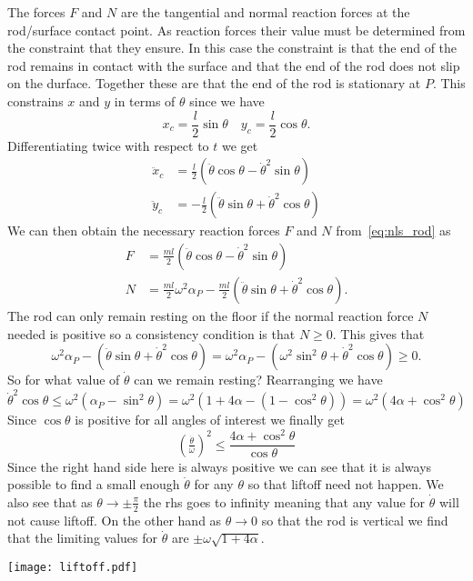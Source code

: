 \documentclass{report}
\begin{document}
The forces $F$ and $N$ are the tangential and normal reaction forces at the
rod/surface contact point. As reaction forces their value must be determined
from the constraint that they ensure. In this case the constraint is that the
end of the rod remains in contact with the surface and that the end of the rod
does not slip on the durface. Together these are that the end of the rod is
stationary at $P$. This constrains $x$ and $y$ in terms of $\theta$ since we
have
\begin{equation*}
  x_c = \frac{l}{2}\sin\theta \quad y_c = \frac{l}{2}\cos\theta.
\end{equation*}
Differentiating twice with respect to $t$ we get
\begin{align*}
  \ddot{x}_c &= \frac{l}{2}(\ddot{\theta}\cos\theta - \dot{\theta}^2\sin\theta) \\
  \ddot{y}_c &= -\frac{l}{2}(\ddot{\theta}\sin\theta + \dot{\theta}^2\cos\theta)
\end{align*}
We can then obtain the necessary reaction forces $F$ and $N$
from~\eqref{eq:nls_rod} as
\begin{align*}
  F &= \frac{ml}{2} (\ddot{\theta}\cos\theta - \dot{\theta}^2\sin\theta) \\
  N &= \frac{ml}{2}\omega^2\alpha_P-\frac{ml}{2} (\ddot{\theta}\sin\theta + \dot{\theta}^2\cos\theta).
\end{align*}
The rod can only remain resting on the floor if the normal reaction force $N$
needed is positive so a consistency condition is that $N \ge 0$. This gives
that
\begin{equation*}
  \omega^2\alpha_P - (\ddot{\theta}\sin\theta + \dot{\theta}^2\cos\theta)
  = \omega^2\alpha_P - (\omega^2\sin^2\theta + \dot{\theta}^2\cos\theta)
  \ge 0.
\end{equation*}
So for what value of $\dot{\theta}$ can we remain resting? Rearranging we have
\begin{equation*}
  \dot{\theta}^2 \cos\theta
    \le \omega^2 (\alpha_P - \sin^2\theta)
    = \omega^2 (1 + 4\alpha - (1 - \cos^2\theta))
    = \omega^2 (4\alpha + \cos^2\theta)
\end{equation*}
Since $\cos\theta$ is positive for all angles of interest we finally get
\begin{equation}
  (\tfrac{\dot{\theta}}{\omega})^2
  \le \frac{4\alpha + \cos^2\theta}{\cos\theta}
  \label{eq:liftoff}
\end{equation}
Since the right hand side here is always positive we can see that it is always
possible to find a small enough $\dot{\theta}$ for any $\theta$ so that
liftoff need not happen. We also see that as $\theta \to \pm\frac{\pi}{2}$ the
rhs goes to infinity meaning that any value for $\dot{\theta}$ will not cause
liftoff. On the other hand as $\theta\to 0$ so that the rod is vertical we
find that the limiting values for $\dot{\theta}$ are $\pm\omega\sqrt{1+4\alpha}$.
\newline
\begin{center}
  \texttt{[image: liftoff.pdf]}
\end{center}
\end{document}

